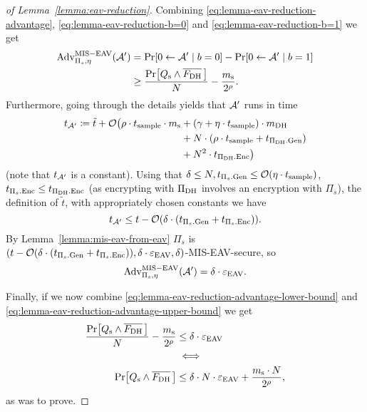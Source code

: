 \begin{proof}[of Lemma~\ref{lemma:eav-reduction}]
	Combining \eqref{eq:lemma-eav-reduction-advantage}, \eqref{eq:lemma-eav-reduction-b=0} and \eqref{eq:lemma-eav-reduction-b=1} we get
	\begin{align} \label{eq:lemma-eav-reduction-advantage-lower-bound}
		\begin{split}
			\advantage{\Pi_s}{\eta}{MIS-EAV}(\adv') & = \pr{0 \from \adv' \mid b = 0} - \pr{0 \from \adv' \mid b = 1}           \\
			& \ge \frac{\pr{\qs \land \overline{\fdh}\,}}{N} - \frac{\ms}{2^\rho}.
		\end{split}
	\end{align}
	Furthermore, going through the details yields that $\mathcal{A}'$ runs in time
	\begin{align*}
		\begin{split}
			t_{\mathcal{A}'} \coloneqq \tilde{t} + \mathcal{O}\big(\rho \cdot t_{\mathrm{sample}} \cdot m_\mathrm{s} & + (\gamma + \eta \cdot t_{\mathrm{sample}}) \cdot m_\mathrm{DH}  \\
			& + N \cdot (\rho \cdot t_{\mathrm{sample}} + t_{\Pi_{\mathrm{DH}}.\mathrm{Gen}})  \\
			& +  N^2 \cdot t_{\Pi_{\mathrm{DH}}.\mathrm{Enc}}\big)
		\end{split}
	\end{align*}
	(note that $t_{\mathcal{A}'}$ is a constant).
	Using that $\delta \le N, t_{\Pi_s.\mathrm{Gen}} \le \mathcal{O}(\eta \cdot t_{\mathrm{sample}})$, $t_{\Pi_s.\mathrm{Enc}} \le t_{\Pi_{\mathrm{DH}}.\mathrm{Enc}}$ (as encrypting with $\Pi_{\mathrm{DH}}$ involves an encryption with $\Pi_s$), the definition of $\tilde{t}$, with appropriately chosen constants we have
	\[
		t_{\mathcal{A}'} \le t - \mathcal{O}(\delta \cdot (t_{\Pi_s.\mathrm{Gen}} + t_{\Pi_s.\mathrm{Enc}})).
	\]
	By Lemma~\ref{lemma:mis-eav-from-eav} $\Pi_s$ is $(t - \mathcal{O}(\delta \cdot (t_{\Pi_s.\mathrm{Gen}} + t_{\Pi_s.\mathrm{Enc}})), \delta \cdot \varepsilon_\mathrm{EAV}, \delta)$-MIS-EAV-secure, so
	\begin{equation} \label{eq:lemma-eav-reduction-advantage-upper-bound}
		\mathrm{Adv}_{\Pi_s, \eta}^{\mathrm{MIS-EAV}}(\mathcal{A}') = \delta \cdot \varepsilon_\mathrm{EAV}.
	\end{equation}

	Finally, if we now combine \eqref{eq:lemma-eav-reduction-advantage-lower-bound} and \eqref{eq:lemma-eav-reduction-advantage-upper-bound} we get
	\begin{align*}
		\frac{\pr{\qs \land \overline{\fdh}\,}}{N} - \frac{\ms}{2^\rho} & \le \delta \cdot \eeav                                       \\
		                                                                & \iff                                                         \\
		\pr{\qs \land \overline{\fdh}\,}                                & \le \delta \cdot N \cdot \eeav + \frac{\ms \cdot N}{2^\rho},
	\end{align*}
	as was to prove.
\end{proof}


